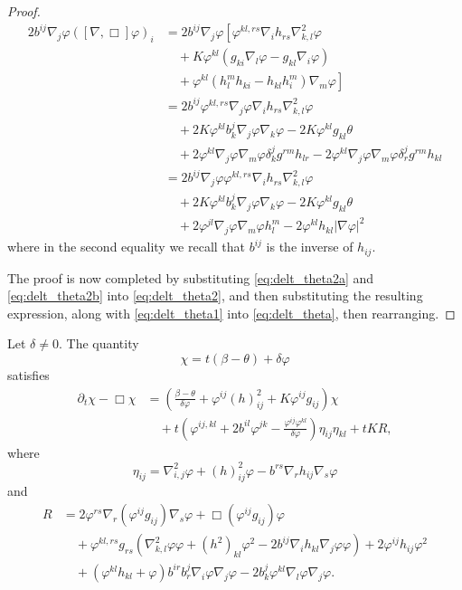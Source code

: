 \documentclass{amsart}
\begin{document}
\begin{proof}
\begin{equation}
\begin{split}
2 b^{ij} \nabla_j \varphi ([\nabla, \Box] \varphi)_i &= 2 b^{ij} \nabla_j \varphi \left[\varphi^{kl,rs} \nabla_i h_{rs} \nabla^2_{k,l} \varphi \right. \\
&\quad + K \varphi^{kl} \left(g_{ki} \nabla_l \varphi - g_{kl} \nabla_i \varphi\right) \\
&\quad + \left. \varphi^{kl}\left(h^{m}_{l}h_{ki} - h_{kl}h^{m}_{i}\right) \nabla_m \varphi\right]  \\
&= 2 b^{ij} \varphi^{kl,rs} \nabla_j \varphi \nabla_i h_{rs} \nabla^2_{k,l} \varphi \\
&\quad + 2 K \varphi^{kl} b^j_k \nabla_j \varphi \nabla_k \varphi - 2K \varphi^{kl}g_{kl} \theta \\
&\quad + 2\varphi^{kl} \nabla_j \varphi \nabla_m \varphi \delta^j_k g^{rm} h_{lr} - 2\varphi^{kl} \nabla_j \varphi \nabla_m \varphi \delta^j_r g^{rm} h_{kl} \\
&= 2 b^{ij} \nabla_j \varphi \varphi^{kl,rs} \nabla_i h_{rs} \nabla^2_{k,l} \varphi \\
&\quad + 2 K \varphi^{kl} b^j_k \nabla_j \varphi \nabla_k \varphi - 2K \varphi^{kl}g_{kl} \theta \\
&\quad + 2\varphi^{jl} \nabla_j \varphi \nabla_m \varphi h^m_l - 2\varphi^{kl} h_{kl} |\nabla \varphi|^2
\end{split}
\end{equation}
where in the second equality we recall that \(b^{ij}\) is the inverse of \(h_{ij}\).

The proof is now completed by substituting \cref{eq:delt_theta2a} and \cref{eq:delt_theta2b} into \cref{eq:delt_theta2}, and then substituting the resulting expression, along with \cref{eq:delt_theta1} into \cref{eq:delt_theta}, then rearranging.
\end{proof}

\begin{theorem}
\label{thm:Evchi}
Let $\delta \neq 0.$ The quantity 
\[
\chi = t(\beta - \theta) + \delta\varphi
\]
satisfies
\[
\begin{split}
\partial_t \chi -\Box\chi &= \left(\frac{\beta - \theta}{\delta\varphi} + \varphi^{ij}(h)^2_{ij} + K\varphi^{ij}g_{ij}\right)\chi \\
& \quad + t\left(\varphi^{ij,kl} + 2b^{il}\varphi^{jk} - \frac{\varphi^{ij}\varphi^{kl}}{\delta\varphi}\right)\eta_{ij}\eta_{kl} + tK R,
\end{split}
\]
where
\[
\eta_{ij} = \nabla^2_{i,j}\varphi + (h)^2_{ij}\varphi - b^{rs}\nabla_r h_{ij}\nabla_s \varphi
\]
and
\[
\begin{split}
R &= 2\varphi^{rs} \nabla_r(\varphi^{ij}g_{ij})\nabla_s\varphi + \Box(\varphi^{ij}g_{ij})\varphi \\
&\quad + \varphi^{kl,rs}g_{rs}\left(\nabla^2_{k,l}\varphi\varphi + (h^2)_{kl}\varphi^{2} - 2b^{ij}\nabla_i h_{kl}\nabla_j\varphi\varphi\right) + 2\varphi^{ij}h_{ij}\varphi^{2} \\
&\quad + (\varphi^{kl}h_{kl} + \varphi)b^{ir}b^{j}_{r}\nabla_i\varphi\nabla_j\varphi - 2 b^{j}_{k}\varphi^{kl}\nabla_l\varphi\nabla_j\varphi.
\end{split}
\]
\end{theorem}
	
\end{document}
